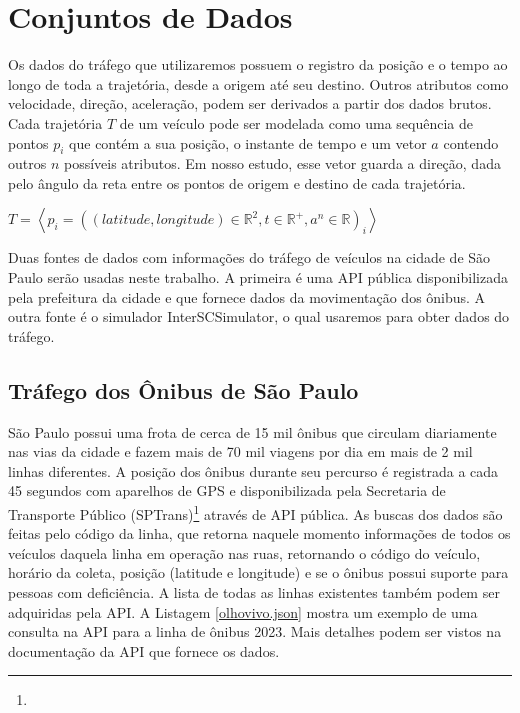 \section{Conjuntos de Dados}
   Os dados do tráfego que utilizaremos possuem o registro da posição e o tempo
ao longo de toda a trajetória, desde a origem até seu destino. Outros atributos
como velocidade, direção, aceleração, podem ser derivados a partir dos dados
brutos. Cada trajetória $T$ de um veículo pode ser modelada como uma sequência
de pontos $p_i$ que contém a sua posição, o instante de tempo e um vetor $a$
contendo outros $n$ possíveis atributos. Em nosso estudo, esse vetor guarda a
direção, dada pelo ângulo da reta entre os pontos de origem e destino de cada
trajetória.

\begin{center}
$T = \left\langle p_i = ((latitude, longitude) \in \mathbb{R}^2, t \in \mathbb{R}^+, a^n \in \mathbb{R})_i \right\rangle$
\end{center}

  Duas fontes de dados com informações do tráfego de veículos na cidade de São
Paulo serão usadas neste trabalho. A primeira é uma API pública disponibilizada
pela prefeitura da cidade e que fornece dados da movimentação dos ônibus. A
outra fonte é o simulador InterSCSimulator, o qual usaremos para obter dados
do tráfego.

\subsection{Tráfego dos Ônibus de São Paulo} São Paulo possui uma frota de
cerca de 15 mil ônibus que circulam diariamente nas vias da cidade e fazem mais
de 70 mil viagens por dia em mais de 2 mil linhas diferentes. A posição dos
ônibus durante seu percurso é registrada a cada 45 segundos com aparelhos de
GPS e disponibilizada pela Secretaria de Transporte Público
(SPTrans)\footnote{}
através de API pública. As buscas dos dados são feitas pelo código da linha,
que retorna naquele momento informações de todos os veículos daquela linha em
operação nas ruas, retornando o código do veículo, horário da coleta, posição
(latitude e longitude) e se o ônibus possui suporte para pessoas com
deficiência. A lista de todas as linhas existentes também podem ser adquiridas
pela API.  A Listagem \ref{olhovivo.json} mostra um exemplo de uma consulta na
API para a linha de ônibus 2023. Mais detalhes podem ser vistos na documentação
da API que fornece os dados.

